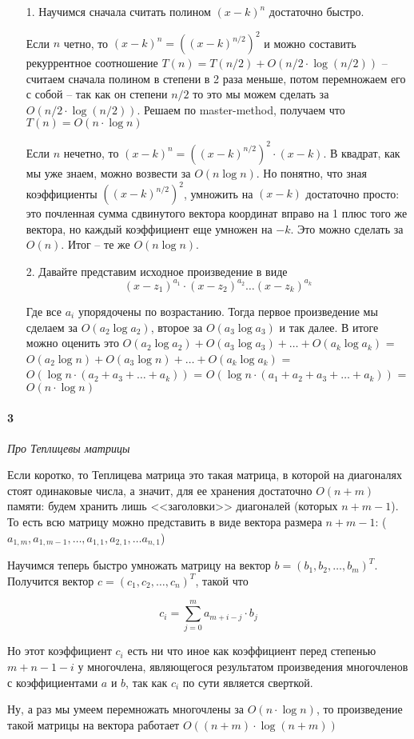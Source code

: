 \documentclass[russian]{article}
\begin{document}
\begin{enumerate}
\item[1.] Научимся сначала считать полином $(x-k)^n$ достаточно быстро.

Если $n$ четно, то $(x-k)^n = ((x-k)^{n/2})^2$ и можно составить рекуррентное соотношение $T(n) = T(n/2) + O(n/2 \cdot \log (n/2))$ -- считаем сначала полином в степени в 2 раза меньше, потом перемножаем его с собой -- так как он степени $n/2$ то это мы можем сделать за $O(n/2 \cdot \log (n/2))$. Решаем по master-method, получаем что $T(n) = O(n \cdot \log n)$

Если $n$ нечетно, то $(x-k)^n = ((x-k)^{n/2})^2 \cdot (x-k)$. В квадрат, как мы уже знаем, можно возвести за $O(n \log n)$. Но понятно, что зная коэффициенты $((x-k)^{n/2})^2$, умножить на $(x-k)$ достаточно просто: это почленная сумма сдвинутого вектора координат вправо на 1 плюс того же вектора, но каждый коэффициент еще умножен на $-k$. Это можно сделать за $O(n)$. Итог -- те же $O(n \log n)$.

\item[2.] Давайте представим исходное произведение в виде 
\[
(x - z_1)^{a_1} \cdot (x - z_2)^{a_2} \ldots (x - z_k)^{a_k}
\]

Где все $a_i$ упорядочены по возрастанию. Тогда первое произведение мы сделаем за $O(a_2 \log a_2)$, второе за $O(a_3 \log a_3)$ и так далее. В итоге можно оценить это $O(a_2 \log a_2) + O(a_3 \log a_3) + \ldots + O(a_k \log a_k)$ = $O(a_2 \log n) + O(a_3 \log n) + \ldots + O(a_k \log a_k)$ = $O(\log n \cdot (a_2 + a_3 + \ldots + a_k))$ = $O(\log n \cdot (a_1 + a_2 + a_3 + \ldots + a_k))$ = $O(n \cdot \log n)$
\end{enumerate}

\paragraph*{3}

\textit{Про Теплицевы матрицы}

Если коротко, то Теплицева матрица это такая матрица, в которой на диагоналях стоят одинаковые числа, а значит, для ее хранения достаточно $O(n+m)$ памяти: будем хранить лишь <<заголовки>> диагоналей (которых $n+m-1$). То есть всю матрицу можно представить в виде вектора размера $n+m-1$: ($a_{1, m}, a_{1, m-1}, \ldots, a_{1, 1}, a_{2, 1}, \ldots a_{n, 1}$)

Научимся теперь быстро умножать матрицу на вектор $b = (b_1, b_2, \ldots, b_m)^T$. Получится вектор $c = (c_1, c_2, \ldots, c_n)^T$, такой что

\[
c_i = \sum_{j=0}^m{a_{m + i - j} \cdot b_j}
\]

Но этот коэффициент $c_i$ есть ни что иное как коэффициент перед степенью $m+n-1-i$ у многочлена, являющегося результатом произведения многочленов с коэффициентами $a$ и $b$, так как $c_i$ по сути является сверткой.

Ну, а раз мы умеем перемножать многочлены за $O(n \cdot \log n)$, то произведение такой матрицы на вектора работает $O((n+m) \cdot \log (n+m))$
\end{document}
